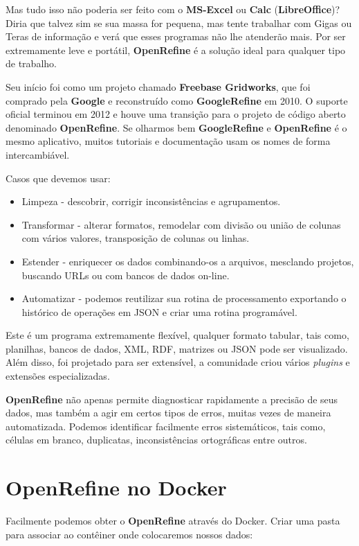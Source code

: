 \documentclass[a4paper,11pt]{article}
\begin{document}
Mas tudo isso não poderia ser feito com o \textbf{MS-Excel} ou \textbf{Calc} (\textbf{LibreOffice})? Diria que talvez sim se sua massa for pequena, mas tente trabalhar com Gigas ou Teras de informação e verá que esses programas não lhe atenderão mais. Por ser extremamente leve e portátil, \textbf{OpenRefine} é a solução ideal para qualquer tipo de trabalho.

Seu início foi como um projeto chamado \textbf{Freebase Gridworks}, que foi comprado pela \textbf{Google} e reconstruído como \textbf{GoogleRefine} em 2010. O suporte oficial terminou em 2012 e houve uma transição para o projeto de código aberto denominado \textbf{OpenRefine}. Se olharmos bem \textbf{GoogleRefine} e \textbf{OpenRefine} é o mesmo aplicativo, muitos tutoriais e documentação usam os nomes de forma intercambiável. 

Casos que devemos usar: \vspace{-1em}
\begin{itemize}
	\item Limpeza - descobrir, corrigir inconsistências e agrupamentos.
	\item Transformar - alterar formatos, remodelar com divisão ou união de colunas com vários valores, transposição de colunas ou linhas.
	\item Estender - enriquecer os dados combinando-os a arquivos, mesclando projetos, buscando URLs ou com bancos de dados on-line.
	\item Automatizar - podemos reutilizar sua rotina de processamento exportando o histórico de operações em JSON e criar uma rotina programável.
\end{itemize}

Este é um programa extremamente flexível, qualquer formato tabular, tais como, planilhas, bancos de dados, XML, RDF, matrizes ou JSON pode ser visualizado. Além disso, foi projetado para ser extensível, a comunidade criou vários \textit{plugins} e extensões especializadas.

\textbf{OpenRefine} não apenas permite diagnosticar rapidamente a precisão de seus dados, mas também a agir em certos tipos de erros, muitas vezes de maneira automatizada. Podemos identificar facilmente erros sistemáticos, tais como, células em branco, duplicatas, inconsistências ortográficas entre outros. 

\section{OpenRefine no Docker}
Facilmente podemos obter o \textbf{OpenRefine} através do Docker. Criar uma pasta para associar ao contêiner onde colocaremos nossos dados: \\
\end{document}
